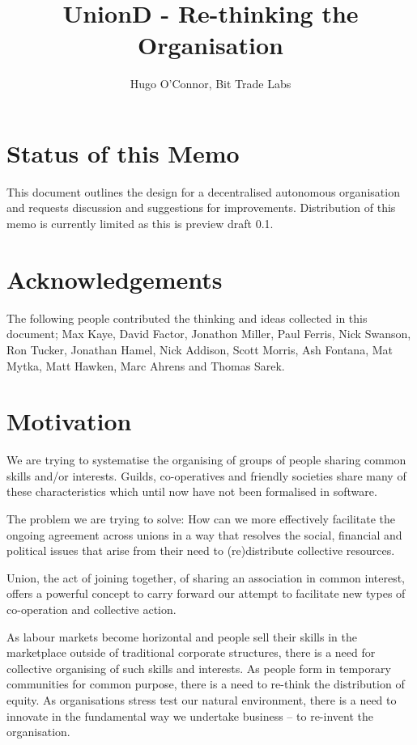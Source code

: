\documentclass[12pt,twocolumn]{article}
\begin{document}
\title{UnionD - Re-thinking the Organisation}
\author{Hugo O'Connor, Bit Trade Labs}
\maketitle
\tableofcontents
\newpage
\section {Status of this Memo}

This document outlines the design for a decentralised autonomous organisation and requests discussion and suggestions for improvements. Distribution of this memo is currently limited as this is preview draft 0.1.

\section {Acknowledgements}

The following people contributed the thinking and ideas collected in this document; Max Kaye, David Factor, Jonathon Miller, Paul Ferris, Nick Swanson, Ron Tucker, Jonathan Hamel, Nick Addison, Scott Morris, Ash Fontana, Mat Mytka, Matt Hawken, Marc Ahrens and Thomas Sarek.

\section {Motivation}

We are trying to systematise the organising of groups of people sharing common skills and/or interests. Guilds, co-operatives and friendly societies share many of these characteristics which until now have not been formalised in software.

The problem we are trying to solve: How can we more effectively facilitate the ongoing agreement across unions in a way that resolves the social, financial and political issues that arise from their need to (re)distribute collective resources.

Union, the act of joining together, of sharing an association in common interest, offers a powerful concept to carry forward our attempt to facilitate new types of co-operation and collective action.

As labour markets become horizontal and people sell their skills in the marketplace outside of traditional corporate structures, there is a need for collective organising of such skills and interests. As people form in temporary communities for common purpose, there is a need to re-think the distribution of equity. As organisations stress test our natural environment, there is a need to innovate in the fundamental way we undertake business – to re-invent the organisation.
\end{document}
